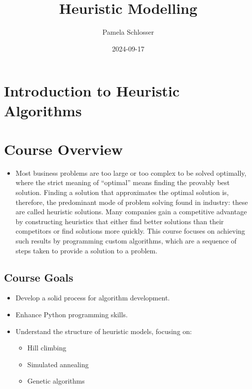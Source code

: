 \documentclass[
  letterpaper,
  DIV=11,
  numbers=noendperiod]{scrreprt}
\title{Heuristic Modelling}
\author{Pamela Schlosser}
\date{2024-09-17}
\providecommand{\tightlist}{%
  \setlength{\itemsep}{0pt}\setlength{\parskip}{0pt}}\usepackage{longtable,booktabs,array}
\renewcommand*\contentsname{Table of contents}
\newcommand\contentsname{Table of contents}
\begin{document}
\maketitle

\renewcommand*\contentsname{Table of contents}
{
\hypersetup{linkcolor=}
\setcounter{tocdepth}{2}
\tableofcontents
}


\chapter{Introduction to Heuristic
Algorithms}\label{introduction-to-heuristic-algorithms}


\chapter{Course Overview}\label{course-overview}

\begin{itemize}
\tightlist
\item
  Most business problems are too large or too complex to be solved
  optimally, where the strict meaning of ``optimal'' means finding the
  provably best solution. Finding a solution that approximates the
  optimal solution is, therefore, the predominant mode of problem
  solving found in industry: these are called heuristic solutions. Many
  companies gain a competitive advantage by constructing heuristics that
  either find better solutions than their competitors or find solutions
  more quickly. This course focuses on achieving such results by
  programming custom algorithms, which are a sequence of steps taken to
  provide a solution to a problem.
\end{itemize}

\section{Course Goals}\label{course-goals}

\begin{itemize}
\tightlist
\item
  Develop a solid process for algorithm development.
\item
  Enhance Python programming skills.
\item
  Understand the structure of heuristic models, focusing on:

  \begin{itemize}
  \tightlist
  \item
    Hill climbing
  \item
    Simulated annealing
  \item
    Genetic algorithms
  \end{itemize}
\end{itemize}
\end{document}
